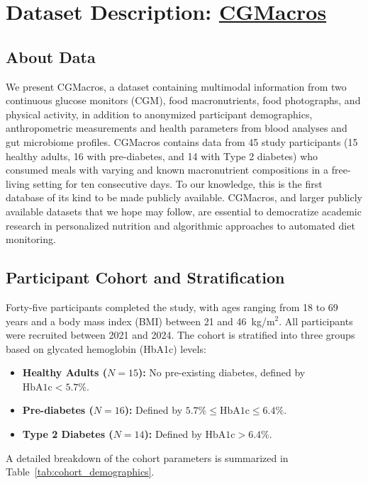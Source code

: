 \documentclass[12pt]{article}
\begin{document}
\vspace{4cm}

\section{Dataset Description: \href{https://physionet.org/content/cgmacros/1.0.0/}{\textcolor{linkblue}{CGMacros}}}

\subsection{About Data}
We present CGMacros, a dataset containing multimodal information from two continuous glucose monitors (CGM), food macronutrients, food photographs, and physical activity, in addition to anonymized participant demographics, anthropometric measurements and health parameters from blood analyses and gut microbiome profiles. CGMacros contains data from 45 study participants (15 healthy adults, 16 with pre-diabetes, and 14 with Type 2 diabetes) who consumed meals with varying and known macronutrient compositions in a free-living setting for ten consecutive days. To our knowledge, this is the first database of its kind to be made publicly available. CGMacros, and larger publicly available datasets that we hope may follow, are essential to democratize academic research in personalized nutrition and algorithmic approaches to automated diet monitoring.

\subsection{Participant Cohort and Stratification}
Forty-five participants completed the study, with ages ranging from 18 to 69 years and a body mass index (BMI) between 21 and 46~kg/m$^2$. All participants were recruited between 2021 and 2024. The cohort is stratified into three groups based on glycated hemoglobin (HbA1c) levels:
\begin{itemize}[leftmargin=*, noitemsep]
    \item \textbf{Healthy Adults ($N=15$):} No pre-existing diabetes, defined by $\text{HbA1c} < 5.7\%$.
    \item \textbf{Pre-diabetes ($N=16$):} Defined by $5.7\% \le \text{HbA1c} \le 6.4\%$.
    \item \textbf{Type 2 Diabetes ($N=14$):} Defined by $\text{HbA1c} > 6.4\%$.
\end{itemize}

A detailed breakdown of the cohort parameters is summarized in Table~\ref{tab:cohort_demographics}.
\end{document}
